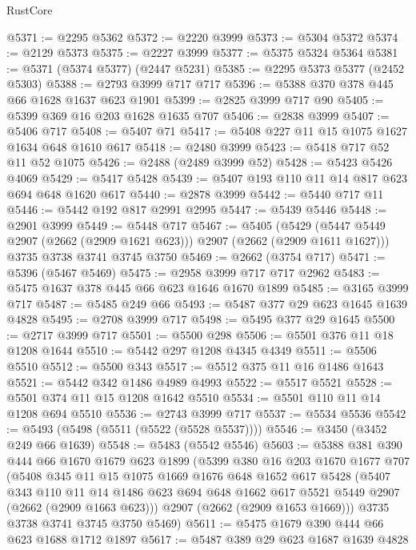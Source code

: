 \begin{lexlean}{RustCore}
\begin{coremodule}
@5371 := @2295 @5362
@5372 := @2220 @3999
@5373 := @5304 @5372
@5374 := @2129 @5373
@5375 := @2227 @3999
@5377 := @5375 @5324 @5364
@5381 := @5371 (@5374 @5377) (@2447 @5231)
@5385 := @2295 @5373 @5377 (@2452 @5303)
@5388 := @2793 @3999 @717 @717
@5396 := @5388 @370 @378 @445 @66 @1628 @1637 @623 @1901
@5399 := @2825 @3999 @717 @90
@5405 := @5399 @369 @16 @203 @1628 @1635 @707
@5406 := @2838 @3999
@5407 := @5406 @717
@5408 := @5407 @71
@5417 := @5408 @227 @11 @15 @1075 @1627 @1634 @648 @1610 @617
@5418 := @2480 @3999
@5423 := @5418 @717 @52 @11 @52 @1075
@5426 := @2488 (@2489 @3999 @52)
@5428 := @5423 @5426 @4069
@5429 := @5417 @5428
@5439 := @5407 @193 @110 @11 @14 @817 @623 @694 @648 @1620 @617
@5440 := @2878 @3999
@5442 := @5440 @717 @11
@5446 := @5442 @192 @817 @2991 @2995
@5447 := @5439 @5446
@5448 := @2901 @3999
@5449 := @5448 @717
@5467 := @5405
    (@5429 (@5447 @5449 @2907 (@2662 (@2909 @1621 @623))) @2907 (@2662 (@2909 @1611 @1627)))
    @3735
    @3738
    @3741
    @3745
    @3750
@5469 := @2662 (@3754 @717)
@5471 := @5396 (@5467 @5469)
@5475 := @2958 @3999 @717 @717 @2962
@5483 := @5475 @1637 @378 @445 @66 @623 @1646 @1670 @1899
@5485 := @3165 @3999 @717
@5487 := @5485 @249 @66
@5493 := @5487 @377 @29 @623 @1645 @1639 @4828
@5495 := @2708 @3999 @717
@5498 := @5495 @377 @29 @1645
@5500 := @2717 @3999 @717
@5501 := @5500 @298
@5506 := @5501 @376 @11 @18 @1208 @1644
@5510 := @5442 @297 @1208 @4345 @4349
@5511 := @5506 @5510
@5512 := @5500 @343
@5517 := @5512 @375 @11 @16 @1486 @1643
@5521 := @5442 @342 @1486 @4989 @4993
@5522 := @5517 @5521
@5528 := @5501 @374 @11 @15 @1208 @1642 @5510
@5534 := @5501 @110 @11 @14 @1208 @694 @5510
@5536 := @2743 @3999 @717
@5537 := @5534 @5536
@5542 := @5493 (@5498 (@5511 (@5522 (@5528 @5537))))
@5546 := @3450 (@3452 @249 @66 @1639)
@5548 := @5483 (@5542 @5546)
@5603 := @5388
    @381
    @390
    @444
    @66
    @1670
    @1679
    @623
    @1899
    (@5399
      @380
      @16
      @203
      @1670
      @1677
      @707
      (@5408
        @345
        @11
        @15
        @1075
        @1669
        @1676
        @648
        @1652
        @617
        @5428
        (@5407
          @343
          @110
          @11
          @14
          @1486
          @623
          @694
          @648
          @1662
          @617
          @5521
          @5449
          @2907
          (@2662 (@2909 @1663 @623)))
        @2907
        (@2662 (@2909 @1653 @1669)))
      @3735
      @3738
      @3741
      @3745
      @3750
      @5469)
@5611 := @5475 @1679 @390 @444 @66 @623 @1688 @1712 @1897
@5617 := @5487 @389 @29 @623 @1687 @1639 @4828

\end{coremodule}
\end{lexlean}
